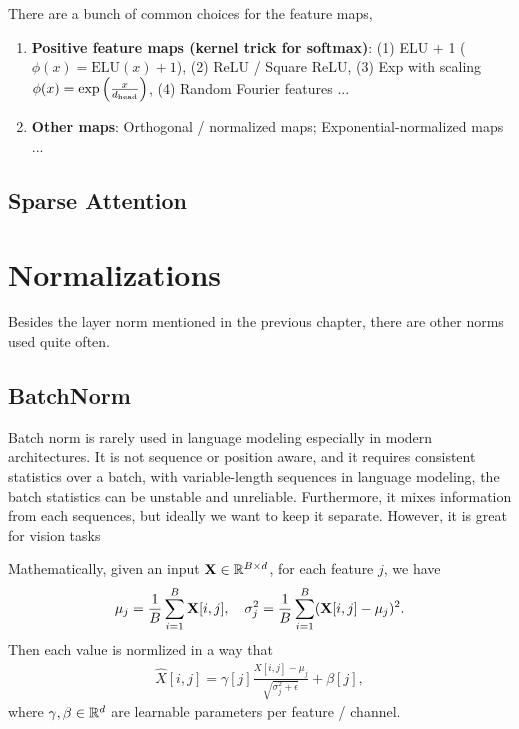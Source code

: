 \documentclass[11pt]{article}  %
\begin{document}
There are a bunch of common choices for the feature maps, 
\begin{enumerate}
  \item \textbf{Positive feature maps (kernel trick for softmax)}: (1) ELU + 1 ($\phi(x) = \text{ELU}(x) + 1$), (2) ReLU / Square ReLU, (3) Exp with scaling $\phi(x) = \exp\left( \frac{x}{d_{\text{head}}} \right)$, (4) Random Fourier features ...
  \item \textbf{Other maps}: Orthogonal / normalized maps; Exponential-normalized maps ...
\end{enumerate}



\subsection{Sparse Attention}


\section{Normalizations}
Besides the layer norm mentioned in the previous chapter, there are other norms used quite often.

\subsection{BatchNorm}
Batch norm is rarely used in language modeling especially in modern architectures. 
It is not sequence or position aware, and it requires consistent statistics over a batch, with variable-length sequences in language modeling, the batch statistics can be unstable and unreliable.
Furthermore, it mixes information from each sequences, but ideally we want to keep it separate. 
However, it is great for vision tasks

Mathematically, given an input $\mathbf{X} \in \mathbb{R}^{B \times d}$, for each feature $j$, we have 
\begin{align*}
  \mu_j = \frac{1}{B}\sum_{i=1}^{B}\mathbf{X}[i, j], \quad \sigma^2_j = \frac{1}{B}\sum_{i=1}^{B}(\mathbf{X}[i, j] - \mu_j)^2.
\end{align*}
Then each value is normlized in a way that 
\begin{align*}
  \hat{X}[i, j] = \gamma[j] \frac{X[i, j] - \mu_j}{\sqrt{\sigma_j^2 + \epsilon}} + \beta[j],
\end{align*}
where $\gamma, \beta \in \mathbb{R}^d$ are learnable parameters per feature / channel.
\end{document}
